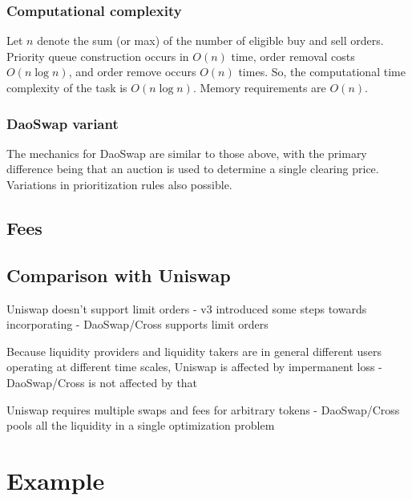\documentclass[11pt, reqno]{amsart}
\begin{document}
\subsubsection{Computational complexity}
Let $n$ denote the sum (or max) of the number of eligible buy and sell orders.
Priority queue construction occurs in $O(n)$ time, order removal costs
$O(n \log n)$, and order remove occurs $O(n)$ times. So, the computational
time complexity of the task is $O(n \log n)$. Memory requirements are $O(n)$.

\subsubsection{DaoSwap variant}
The mechanics for DaoSwap are similar to those above, with the primary
difference being that an auction is used to determine a single clearing price.
Variations in prioritization rules also possible.


\subsection{Fees}


\subsection{Comparison with Uniswap}

Uniswap doesn't support limit orders
- v3 introduced some steps towards incorporating 
- DaoSwap/Cross supports limit orders

Because liquidity providers and liquidity takers are in general different users
operating at different time scales, Uniswap is affected by impermanent loss
- DaoSwap/Cross is not affected by that

Uniswap requires multiple swaps and fees for arbitrary tokens
- DaoSwap/Cross pools all the liquidity in a single optimization problem

\section{Example}

\end{document}

